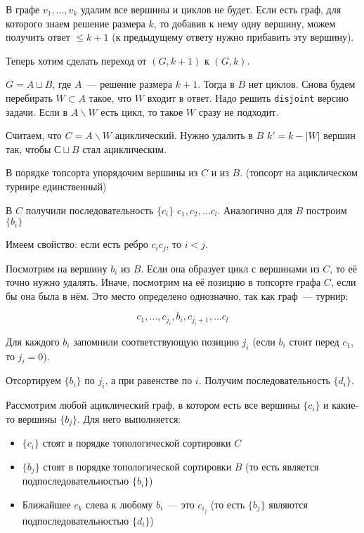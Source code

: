 \documentclass[12pt]{article}
\renewcommand{\le}{\leqslant}
\theoremstyle{definition} %
\theoremstyle{plain} %
\theoremstyle{remark} %
\begin{document}
В графе $v_1,\dots, v_k$ удалим все вершины и циклов не будет. Если есть граф, для которого знаем решение размера $k$, то добавив к нему одну вершину, можем получить ответ $\le k+1$ (к предыдущему ответу нужно прибавить эту вершину). 

Теперь хотим сделать переход от $(G, k+1)$ к $(G, k)$.

$G = A\sqcup B$, где $A$~--- решение размера $k+1$. Тогда в $B$ нет циклов. Снова будем перебирать $W\subset A$ такое, что $W$ входит в ответ. Надо решить {\tt disjoint} версию задачи. Если в $A\backslash W$ есть цикл, то такое $W$ сразу не подходит.

Считаем, что $C = A\backslash W$ ациклический. Нужно удалить в $B$ $k' = k-|W|$ вершин так, чтобы $С\sqcup B$ стал ациклическим. 

В порядке топсорта упорядочим вершины из $C$ и из $B$. (топсорт на ациклическом турнире единственный) 

В $C$ получили последовательность $\{c_i\}$ $c_1, c_2, \dots c_l$. Аналогично для $B$ построим $\{b_i\}$

Имеем свойство: если есть ребро $c_ic_j$, то $i<j$.

Посмотрим на вершину $b_i$ из $B$. Если она образует цикл с вершинами из $C$, то её точно нужно удалять. Иначе, посмотрим на её позицию в топсорте графа $C$, если бы она была в нём. Это место определено однозначно, так как граф~--- турнир:

$$c_1,\dots,c_{j_i},b_i,c_{{j_i}+1},\dots c_l$$ 

Для каждого $b_i$ запомнили соответствующую позицию $j_i$ (если $b_i$ стоит перед $c_1$, то $j_i = 0$).

Отсортируем $\{b_i\}$ по $j_i$, а при равенстве по $i$. Получим последовательность $\{d_i\}$.

Рассмотрим любой ациклический граф, в котором есть все вершины $\{c_i\}$ и какие-то вершины $\{b_j\}$. Для него выполняется:

\begin{itemize}
  \item $\{c_i\}$ стоят в порядке топологической сортировки $C$
  \item $\{b_j\}$ стоят в порядке топологической сортировки $B$ (то есть является подпоследовательностью $\{b_i\}$)
  \item Ближайшее $c_k$ слева к любому $b_i$~--- это $c_{i_j}$ (то есть $\{b_j\}$ являются подпоследовательностью $\{d_i\}$)
\end{itemize}
\end{document}
